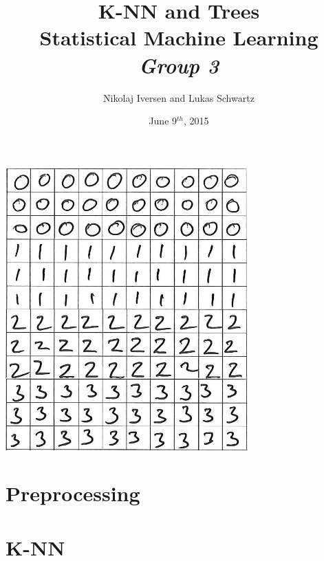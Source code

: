 \documentclass[11pt,a4paper]{article}
\begin{document}
\title{K-NN and Trees\\Statistical Machine Learning\\{\large\emph{Group 3}}}
\author{Nikolaj Iversen and Lukas Schwartz}
\date{June 9$^{th}$, 2015}
\maketitle

\vfill
\begin{center}
\includegraphics[width=0.7\textwidth]{graphics/digit_example}
\end{center}

\newpage





\newpage

\tableofcontents
\listoffigures
\listoftables

\newpage



\newpage

\section{Preprocessing}








\newpage
\section{K-NN}

\end{document}
